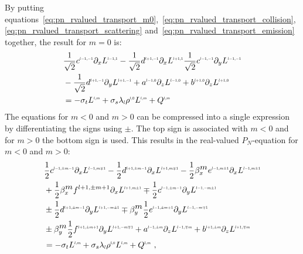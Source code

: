 By putting equations~\ref{eq:pn_rvalued_transport_m0},~\ref{eq:pn_rvalued_transport_collision},~\ref{eq:pn_rvalued_transport_scattering} and~\ref{eq:pn_rvalued_transport_emission} together, the result for $m=0$ is:
\begin{align}
&
\frac{1}{\sqrt{2}}c^{\scaleto{l-1,-1}{4pt}}\partial_x L^{\scaleto{l-1,1}{4pt}}
-\frac{1}{\sqrt{2}}d^{\scaleto{l+1,-1}{4pt}}\partial_x L^{\scaleto{l+1,1}{4pt}}
\frac{1}{\sqrt{2}}c^{\scaleto{l-1,-1}{4pt}}\partial_y L^{\scaleto{l-1,-1}{4pt}}
\nonumber
\\&
-\frac{1}{\sqrt{2}}d^{\scaleto{l+1,-1}{4pt}}\partial_y L^{\scaleto{l+1,-1}{4pt}}
+a^{\scaleto{l-1,0}{4pt}}\partial_z L^{\scaleto{l-1,0}{4pt}}
+b^{\scaleto{l+1,0}{4pt}}\partial_z L^{\scaleto{l+1,0}{4pt}}
\nonumber
\\&
=
-\sigma_t L^{\scaleto{l,m}{4pt}}
+\sigma_s\lambda_{\scaleto{l}{4pt}}\phase^{\scaleto{l,0}{4pt}}L^{\scaleto{l,m}{4pt}}
+ Q^{\scaleto{l,m}{4pt}}
\end{align}
The equations for $m<0$ and $m>0$ can be compressed into a single expression by differentiating the signs using $\pm$. The top sign is associated with $m<0$ and for $m>0$ the bottom sign is used. This results in the real-valued $P_N$-equation for $m<0$ and $m>0$:
\begin{align}
&
\frac{1}{2}c^{\scaleto{l-1,\pm m-1}{4pt}}\partial_x L^{\scaleto{l-1,m\mp 1}{4pt}}
-\frac{1}{2}d^{\scaleto{l+1,\pm m-1}{4pt}}\partial_x L^{\scaleto{l+1,m\mp 1}{4pt}}
-\frac{1}{2}\beta_x^{\scaleto{m}{4pt}}e^{\scaleto{l-1,m\pm 1}{4pt}}\partial_x L^{\scaleto{l-1,m\pm 1}{4pt}}
\nonumber
\\&
+\frac{1}{2}\beta_x^{\scaleto{m}{4pt}}f^{l+1,\pm m+1}\partial_x L^{\scaleto{l+1,m\pm 1}{4pt}}
\mp \frac{1}{2}c^{\scaleto{l-1,\pm m-1}{4pt}}\partial_y L^{\scaleto{l-1,-m\pm 1}{4pt}}
\nonumber
\\&
\pm \frac{1}{2}d^{\scaleto{l+1,\pm m-1}{4pt}}\partial_y L^{\scaleto{l+1,-m \pm 1}{4pt}}
\mp \beta_y^{\scaleto{m}{4pt}}\frac{1}{2}e^{\scaleto{l-1,\pm m+1}{4pt}}\partial_y L^{\scaleto{l-1,-m\mp 1}{4pt}}
\nonumber
\\&
\pm \beta_y^{\scaleto{m}{4pt}}\frac{1}{2}f^{\scaleto{l+1,\pm m+1}{4pt}}\partial_y L^{\scaleto{l+1,-m\mp 1}{4pt}}
+a^{\scaleto{l-1,\pm m}{4pt}}\partial_z L^{\scaleto{l-1,\mp m}{4pt}}
+b^{\scaleto{l+1,\pm m}{4pt}}\partial_z L^{\scaleto{l+1,\mp m}{4pt}}
\nonumber
\\&
=
-\sigma_t L^{\scaleto{l,m}{4pt}}
+\sigma_s\lambda_{\scaleto{l}{4pt}}\phase^{\scaleto{l,0}{4pt}}L^{\scaleto{l,m}{4pt}}
+Q^{\scaleto{l,m}{4pt}}
\ ,
\end{align}
